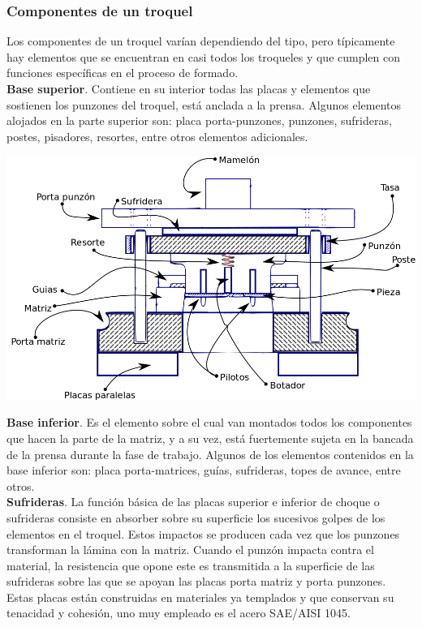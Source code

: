 \subsubsection{Componentes de un troquel}

Los componentes de un troquel varían dependiendo del tipo, pero típicamente hay elementos 
que se encuentran en casi todos los troqueles y que cumplen con funciones específicas 
en el proceso de formado.\\

\textbf{Base superior}. Contiene en su interior todas las placas y elementos que sostienen 
los punzones del troquel, está anclada a la prensa. Algunos elementos alojados en 
la parte superior son: placa porta-punzones, punzones, sufrideras, postes, pisadores, resortes, 
entre otros elementos adicionales.\\


\begin{center}
\includegraphics[scale=0.3]{src/ch2/componentes_troquel.png}
\label{fig:componentes_troquel}
\end{center}


\textbf{Base inferior}. Es el elemento sobre el cual van montados todos los componentes 
que hacen la parte de la matriz, y a su vez, está fuertemente sujeta en la bancada 
de la prensa durante la fase de trabajo. Algunos de los elementos contenidos en 
la base inferior son: placa  porta-matrices, guías, sufrideras, topes de avance, entre 
otros.\\

\textbf{Sufrideras}. La función básica de las placas superior e inferior de choque o sufrideras 
consiste en absorber sobre su superficie los sucesivos golpes de los elementos en el troquel. 
Estos impactos se producen cada vez que los punzones transforman la lámina con la matriz. Cuando 
el punzón impacta contra el material, la resistencia que opone este es transmitida a la 
superficie de las sufrideras sobre las que se apoyan las placas porta matriz y porta punzones. 
Estas placas están construidas en materiales ya templados y que conservan su tenacidad y cohesión, 
uno muy empleado es el acero SAE/AISI 1045.\\

